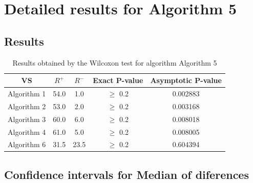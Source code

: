 \documentclass[a4paper,10pt]{article}
\begin{document}
 \clearpage 


\section{Detailed results for Algorithm 5}


\subsection{Results}

\begin{table}[!htp]
\centering\small
\begin{tabular}{
|c|c|c|c|c|}
\hline
 VS & $R^{+}$ & $R^{-}$ & Exact P-value & Asymptotic P-value \\ \hline 
Algorithm 1 & 54.0 & 1.0 & $\geq$ 0.2 & 0.002883\\ \hline 
Algorithm 2 & 53.0 & 2.0 & $\geq$ 0.2 & 0.003168\\ \hline 
Algorithm 3 & 60.0 & 6.0 & $\geq$ 0.2 & 0.008018\\ \hline 
Algorithm 4 & 61.0 & 5.0 & $\geq$ 0.2 & 0.008005\\ \hline 
Algorithm 6 & 31.5 & 23.5 & $\geq$ 0.2 & 0.604394\\ \hline 

\end{tabular}
\caption{Results obtained by the Wilcoxon test for algorithm Algorithm 5}
\end{table}

\subsection{Confidence intervals for Median of diferences}
\end{document}
